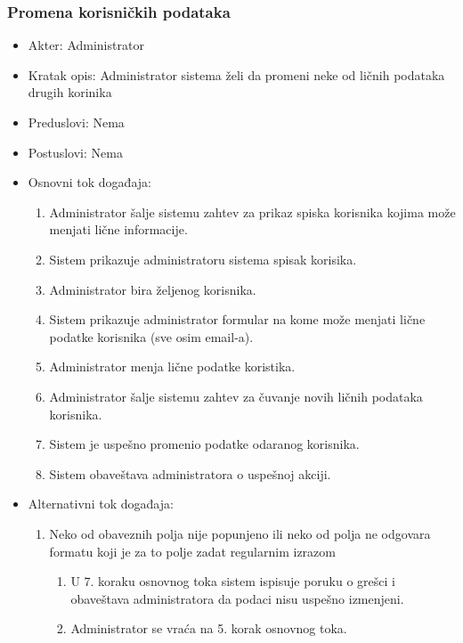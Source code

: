 \documentclass[a4paper]{article}
\begin{document}
\subsubsection{Promena korisničkih podataka}
\label{subsubsection:promenakorisnickihpodataka}
\begin{itemize}
    \item Akter: Administrator
    \item Kratak opis: Administrator sistema želi da promeni neke od ličnih podataka drugih korinika
    \item Preduslovi: Nema
    \item Postuslovi: Nema
    \item Osnovni tok događaja:
        \begin{enumerate}
            \item Administrator šalje sistemu zahtev za prikaz spiska korisnika kojima može menjati lične informacije.
            \item Sistem prikazuje administratoru sistema spisak korisika.
            \item Administrator bira željenog korisnika.
            \item Sistem prikazuje administrator formular na kome može menjati lične podatke korisnika (sve osim email-a).
            \item Administrator menja lične podatke koristika.
            \item Administrator šalje sistemu zahtev za čuvanje novih ličnih podataka korisnika.
            \item Sistem je uspešno promenio podatke odaranog korisnika.
            \item Sistem obaveštava administratora o uspešnoj akciji.
        \end{enumerate}
    \item Alternativni tok događaja:
        \begin{enumerate}
            \item Neko od obaveznih polja nije popunjeno ili neko od polja ne odgovara formatu koji je za to polje zadat regularnim izrazom
                \begin{enumerate}
                    \item U 7. koraku osnovnog toka sistem ispisuje poruku o grešci i obaveštava administratora da podaci nisu uspešno izmenjeni.
                    \item Administrator se vraća na 5. korak osnovnog toka.
                \end{enumerate}
        \end{enumerate}
\end{itemize}
\end{document}
